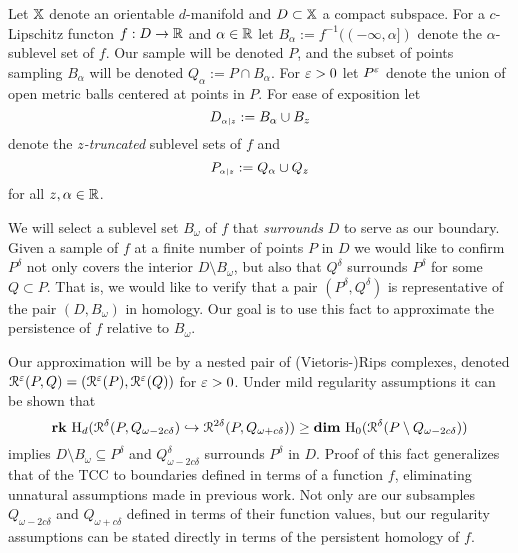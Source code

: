 
Let $\mathbb{X}$ denote an orientable $d$-manifold and $D\subset\mathbb{X}$ a compact subspace.
For a $c$-Lipschitz functon $f : D\to \mathbb{R}$ and $\alpha\in\mathbb{R}$ let $B_\alpha := f^{-1}((-\infty,\alpha])$ denote the $\alpha$-sublevel set of $f$.
Our sample will be denoted $P$, and the subset of points sampling $B_\alpha$ will be denoted $Q_\alpha := P\cap B_\alpha$.
For $\varepsilon > 0$ let $P^\varepsilon$ denote the union of open metric balls centered at points in $P$.
For ease of exposition let
\[ D_{\scriptscriptstyle \alpha\mid z} := B_\alpha\cup B_z \]
denote the \emph{$z$-truncated} sublevel sets of $f$ and %
\[ P_{\scriptscriptstyle \alpha\mid z} := Q_\alpha\cup Q_z\]
for all $z,\alpha\in\mathbb{R}$.

We will select a sublevel set $B_\omega$ of $f$ that \emph{surrounds} $D$ to serve as our boundary.
Given a sample of $f$ at a finite number of points $P$ in $D$ we would like to confirm $P^\delta$ not only covers the interior $D\setminus B_\omega$, but also that $Q^\delta$ surrounds $P^\delta$ for some $Q\subset P$.
That is, we would like to verify that a pair $(P^\delta, Q^\delta)$ is representative of the pair $(D,B_\omega)$ in homology.
Our goal is to use this fact to approximate the persistence of $f$ relative to $B_\omega$.

Our approximation will be by a nested pair of (Vietoris-)Rips complexes, denoted $\mathcal{R}^\varepsilon(P, Q) = (\mathcal{R}^\varepsilon(P), \mathcal{R}^\varepsilon(Q))$ for $\varepsilon > 0$.
Under mild regularity assumptions it can be shown that
\[ \mathbf{rk}~\mathrm{H}_d(\mathcal{R}^\delta(P, Q_{\omega - 2c\delta})\hookrightarrow \mathcal{R}^{2\delta}(P, Q_{\omega+c\delta}))\geq \mathbf{dim}~\mathrm{H}_0(\mathcal{R}^\delta(P\setminus Q_{\omega-2c\delta}))\]
implies $D\setminus B_\omega\subseteq P^\delta$ and $Q_{\omega-2c\delta}^\delta$ surrounds $P^\delta$ in $D$.
Proof of this fact generalizes that of the TCC to boundaries defined in terms of a function $f$, eliminating unnatural assumptions made in previous work.
Not only are our subsamples $Q_{\omega-2c\delta}$ and $Q_{\omega+c\delta}$ defined in terms of their function values, but our regularity assumptions can be stated directly in terms of the persistent homology of $f$.


